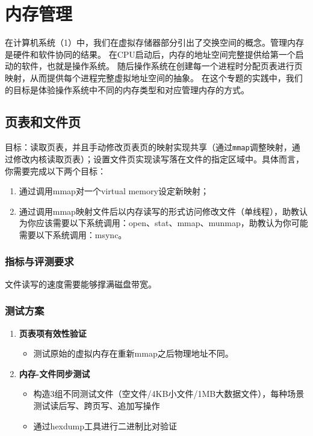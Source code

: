 \chapter{内存管理}
在计算机系统（1）中，我们在虚拟存储器部分引出了交换空间的概念。管理内存是硬件和软件协同的结果。
在CPU启动后，内存的地址空间完整提供给第一个启动的软件，也就是操作系统。
随后操作系统在创建每一个进程时分配页表进行页映射，从而提供每个进程完整虚拟地址空间的抽象。
在这个专题的实践中，我们的目标是体验操作系统中不同的内存类型和对应管理内存的方式。

\section{页表和文件页}
目标：读取页表，并且手动修改页表页的映射实现共享（通过\texttt{mmap}调整映射，通过修改内核读取页表）；设置文件页实现读写落在文件的指定区域中。具体而言，你需要完成以下两个目标：
\begin{enumerate}
    \item 通过调用mmap对一个virtual memory设定新映射；
    \item 通过调用mmap映射文件后以内存读写的形式访问修改文件（单线程），助教认为你应该需要以下系统调用：open、stat、mmap、munmap，助教认为你可能需要以下系统调用：msync。
\end{enumerate}
\subsection*{指标与评测要求}
文件读写的速度需要能够撑满磁盘带宽。

\subsection*{测试方案}
\begin{enumerate}
    \item \textbf{页表项有效性验证}
    \begin{itemize}
        \item 测试原始的虚拟内存在重新mmap之后物理地址不同。
    \end{itemize}
    
    \item \textbf{内存-文件同步测试}
    \begin{itemize}
        \item 构造3组不同测试文件（空文件/4KB小文件/1MB大数据文件），每种场景测试读后写、跨页写、追加写操作
        \item 通过hexdump工具进行二进制比对验证
    \end{itemize}
\end{enumerate}


